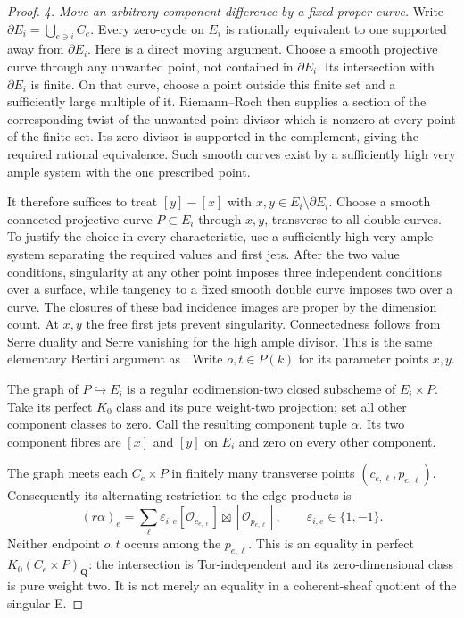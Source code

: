 \begin{proof}
\emph{4. Move an arbitrary component difference by a fixed proper curve.}
Write $\partial E_i=\bigcup_{e\ni i}C_e$.
Every zero-cycle on $E_i$ is rationally equivalent to one supported
away from $\partial E_i$. Here is a direct moving argument.
Choose a smooth projective curve through any unwanted point,
not contained in $\partial E_i$. Its intersection with $\partial E_i$
is finite. On that curve, choose a point outside this finite set and
a sufficiently large multiple of it. Riemann--Roch then supplies
a section of the corresponding twist of the unwanted point divisor
which is nonzero at every point of the finite set. Its zero divisor
is supported in the complement, giving the required rational
equivalence. Such smooth curves exist by a sufficiently high
very ample system with the one prescribed point.

It therefore suffices to treat $[y]-[x]$ with
$x,y\in E_i\setminus\partial E_i$. Choose a smooth connected
projective curve $P\subset E_i$ through $x,y$, transverse to all
double curves. To justify the choice in every characteristic, use
a sufficiently high very ample system separating the required values
and first jets. After the two value conditions, singularity at any
other point imposes three independent conditions over a surface,
while tangency to a fixed smooth double curve imposes two over a
curve. The closures of these bad incidence images are proper by
the dimension count. At $x,y$ the free first jets prevent singularity.
Connectedness follows from Serre duality and Serre vanishing for
the high ample divisor. This is the same elementary Bertini argument
as \citet[Lemma 33.47.3]{D_StacksBertiniUniformHigher}.
Write $o,t\in P(k)$ for its parameter points $x,y$.

The graph of $P\hookrightarrow E_i$ is a regular codimension-two
closed subscheme of $E_i\times P$. Take its perfect $K_0$ class and
its pure weight-two projection; set all other component classes
to zero. Call the resulting component tuple $\alpha$.
Its two component fibres are $[x]$ and $[y]$ on $E_i$ and zero
on every other component.

The graph meets each $C_e\times P$ in finitely many transverse
points $(c_{e,\ell},p_{e,\ell})$. Consequently its alternating
restriction to the edge products is
\begin{equation}
 (r\alpha)_e=
    \sum_\ell\varepsilon_{i,e}
           [\mathcal O_{c_{e,\ell}}]\boxtimes
                              [\mathcal O_{p_{e,\ell}}],
             \qquad \varepsilon_{i,e}\in\{1,-1\}.       \tag{TF.8}
\end{equation}
Neither endpoint $o,t$ occurs among the $p_{e,\ell}$.
This is an equality in perfect $K_0(C_e\times P)_{\mathbf Q}$:
the intersection is Tor-independent and its zero-dimensional
class is pure weight two. It is not merely an equality in a
coherent-sheaf quotient of the singular E.


\end{proof}
